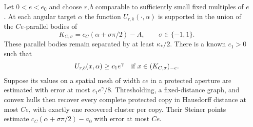 \begin{lemma}
\label{lem:single-finite-copies}
Let $0<e<e_0$ and choose $r,b$ comparable to sufficiently small fixed
multiples of $e$.  At each angular target $\alpha$ the function
$U_{r,b}(\cdot,\alpha)$ is supported in the union of the $Ce$-parallel
bodies of
\begin{equation}\label{eq:single-target-copies}
                 K_{C,\sigma}=c_C(\alpha+\sigma\pi/2)-A,
                         \qquad \sigma\in\{-1,1\}.
\end{equation}
These parallel bodies remain separated by at least $\kappa_*/2$.
There is a known $c_1>0$ such that
\begin{equation}\label{eq:single-interior-signal}
 U_{r,b}(x,\alpha)\ge c_1e^\gamma
            \quad\hbox{if }x\in(K_{C,\sigma})_{-e}.
\end{equation}
Suppose its values on a spatial mesh of width $c e$ in a protected
aperture are estimated with error at most $c_1e^\gamma/8$.
Thresholding, a fixed-distance graph, and convex hulls then recover
every complete protected copy in Hausdorff distance at most $Ce$,
with exactly one recovered cluster per copy.  Their Steiner points
estimate $c_C(\alpha+\sigma\pi/2)-a_0$ with error at most $Ce$.
\end{lemma}
